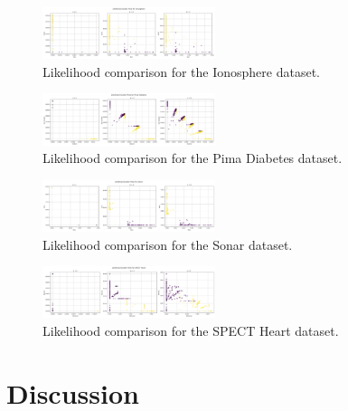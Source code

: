 \documentclass[conference]{IEEEtran}
\begin{document}
\begin{figure}[H]
    \centering
    \includegraphics[width=0.45\textwidth]{../scripts/comparison_results/Ionosphere_likelihood.png}
    \caption{Likelihood comparison for the Ionosphere dataset.}
    \label{fig:ionosphere_likelihood}
\end{figure}

\begin{figure}[H]
    \centering
    \includegraphics[width=0.45\textwidth]{../scripts/comparison_results/Pima Diabetes_likelihood.png}
    \caption{Likelihood comparison for the Pima Diabetes dataset.}
    \label{fig:pima_diabetes_likelihood}
\end{figure}

\begin{figure}[H]
    \centering
    \includegraphics[width=0.45\textwidth]{../scripts/comparison_results/Sonar_likelihood.png}
    \caption{Likelihood comparison for the Sonar dataset.}
    \label{fig:sonar_likelihood}
\end{figure}

\begin{figure}[H]
    \centering
    \includegraphics[width=0.45\textwidth]{../scripts/comparison_results/SPECT Heart_likelihood.png}
    \caption{Likelihood comparison for the SPECT Heart dataset.}
    \label{fig:spect_heart_likelihood}
\end{figure}

\section{Discussion}
\end{document}

